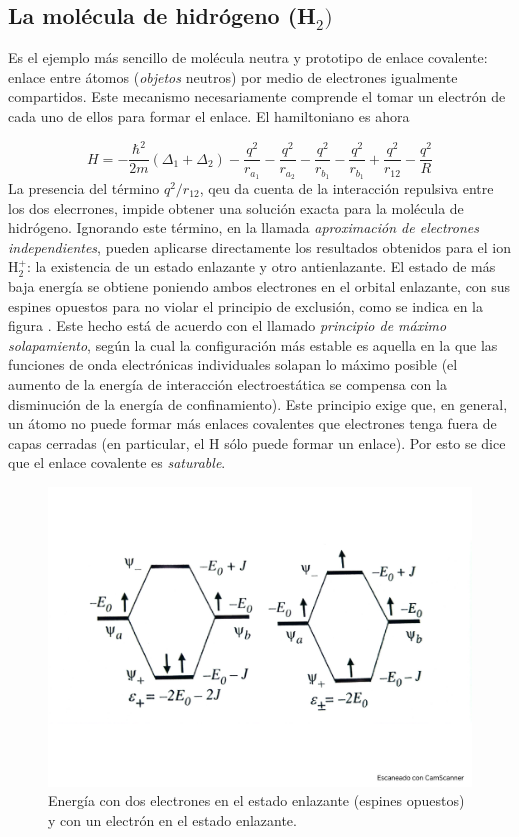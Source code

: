 \subsection{La molécula de hidrógeno (H$_2)$}

Es el ejemplo más sencillo de molécula neutra y prototipo de enlace covalente: enlace entre átomos (\textit{objetos} neutros) por medio de electrones igualmente compartidos. Este mecanismo necesariamente comprende el tomar un electrón de cada uno de ellos para formar el enlace. El hamiltoniano es ahora

\begin{equation*}
    H = - \frac{\hbar^2}{2m} (\Delta_1 + \Delta_2) - \frac{q^2}{r_{a_1}} - \frac{q^2}{r_{a_2}} - \frac{q^2}{r_{b_1}} - \frac{q^2}{r_{b_1}} + \frac{q^2}{r_{12}} - \frac{q^2}{R}
\end{equation*}
La presencia del término $q^2/r_{12}$, qeu da cuenta de la interacción repulsiva entre los dos elecrrones, impide obtener una solución exacta para la molécula de hidrógeno. Ignorando este término, en la llamada \textit{aproximación de electrones independientes}, pueden aplicarse directamente los resultados obtenidos para el ion H$_2^+$: la existencia de un estado enlazante y otro antienlazante. El estado de más baja energía se obtiene poniendo ambos electrones en el orbital enlazante, con sus espines opuestos para no violar el principio de exclusión, como se indica en la figura . Este hecho está de acuerdo con el llamado \textit{principio de máximo solapamiento}, según la cual la configuración más estable es aquella en la que las funciones de onda electrónicas individuales solapan lo máximo posible (el aumento de la energía de interacción electroestática se compensa con la disminución de la energía de confinamiento). Este principio exige que, en general, un átomo no puede formar más enlaces covalentes que electrones tenga fuera de capas cerradas (en particular, el H sólo puede formar un enlace). Por esto se dice que el enlace covalente es \textit{saturable}. 

\begin{figure}[h!] \centering
    \includegraphics[scale=0.5]{Cuerpo/Ch_03/Fotos libro 5.pdf}
    \caption{Energía con dos electrones en el estado enlazante (espines opuestos) y con un electrón en el estado enlazante.}
    \label{Fig:03-06}
\end{figure}    


